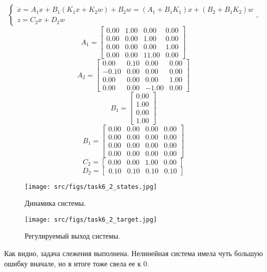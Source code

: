 \[
    \begin{cases}
        \dot{x} = A_1x + B_1 (K_1x + K_2w) + B_2w = (A_1 + B_1 K_1) x + (B_2 + B_1 K_2)w \\
        z = C_2x + D_2 w
    \end{cases},
\]
\[A_1 = \begin{bmatrix}
        0.00 &  1.00 &  0.00 &  0.00\\
        0.00 &  0.00 &  1.00 &  0.00\\
        0.00 &  0.00 &  0.00 &  1.00\\
        0.00 &  0.00 &  11.00 &  0.00
      \end{bmatrix}\]
      \[A_2 = \begin{bmatrix}
        0.00 &  0.10 &  0.00 &  0.00\\
       -0.10 &  0.00 &  0.00 &  0.00\\
        0.00 &  0.00 &  0.00 &  1.00\\
        0.00 &  0.00 & -1.00 &  0.00
      \end{bmatrix}\]
      \[B_1 = \begin{bmatrix}
        0.00\\
        1.00\\
        0.00\\
        1.00
      \end{bmatrix}\]
      \[B_1 = \begin{bmatrix}
        0.00 &  0.00 &  0.00 &  0.00\\
        0.00 &  0.00 &  0.00 &  0.00\\
        0.00 &  0.00 &  0.00 &  0.00\\
        0.00 &  0.00 &  0.00 &  0.00
      \end{bmatrix}\]
      \[C_2 = \begin{bmatrix}
        0.00 &  0.00 &  1.00 &  0.00
      \end{bmatrix}\]
      \[D_2 = \begin{bmatrix}
        0.10 &  0.10 &  0.10 &  0.10
      \end{bmatrix}\]
\begin{figure}[ht!]
        \centering
        \texttt{[image: src/figs/task6\_2\_states.jpg]}
        \caption{Динамика системы.}
        \label{fig:task6_2_states}
\end{figure}

\begin{figure}[ht!]
        \centering
        \texttt{[image: src/figs/task6\_2\_target.jpg]}
        \caption{Регулируемый выход системы.}
        \label{fig:task6_2_z}
\end{figure}
Как видно, задача слежения выполнена. Нелинейная система имела чуть большую ошибку вначале, но в итоге тоже свела ее к 0.
\FloatBarrier